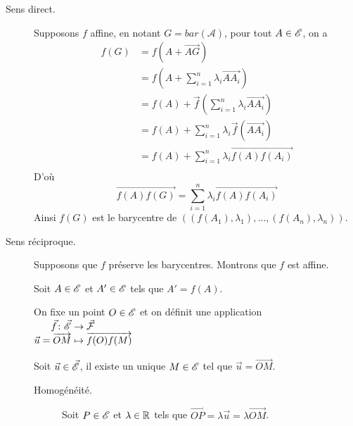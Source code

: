 \documentclass[a4paper,12pt]{article}
\begin{document}
\begin{demonstration}
    \begin{description}
        \item[Sens direct.] %
        Supposons $f$ affine, en notant $G = bar(\mathcal{A})$, pour tout $A \in \mathscr{E}$, on a
        \begin{align*}
            f(G) &= f(A + \overrightarrow{AG}) \\
        &= f(A + \sum_{i=1}^n \lambda_i \overrightarrow{A A_i}) \\
        &= f(A) + \vec{f}(\sum_{i=1}^n \lambda_i \overrightarrow{A A_i}) \\
        &= f(A) + \sum_{i=1}^n \lambda_i \vec{f}(\overrightarrow{A A_i}) \\
        &= f(A) + \sum_{i=1}^n \lambda_i \overrightarrow{f(A) f(A_i)} \\
        \end{align*}
        D'où
        $$
        \overrightarrow{f(A) f(G)} = \sum_{i=1}^n \lambda_i \overrightarrow{f(A) f(A_i)}
        $$
        Ainsi $f(G)$ est le barycentre de $((f(A_1), \lambda_1), \dots, (f(A_n), \lambda_n))$.
        
        \item[Sens réciproque.] %
        Supposons que $f$ préserve les barycentres. Montrons que $f$ est affine.

        Soit $A \in \mathscr{E}$ et $A' \in \mathscr{E}$ tels que $A' = f(A)$.

        On fixe un point $O \in \mathscr{E}$ et on définit une application $\funcdef{\vec{f}}{\vec{\E}}{\vec{\mathcal{F}}}{\vec{u} = \overrightarrow{OM}}{\overrightarrow{f(O)f(M)}}$

        Soit $\vec{u} \in \vec{\mathscr{E}}$, il existe un unique $M \in \mathscr{E}$ tel que $\vec{u} = \overrightarrow{OM}$.

        \begin{description}
            \item[Homogénéité.] %
            Soit $P \in \mathscr{E}$ et $\lambda \in \mathbb{R}$ tels que $\overrightarrow{OP} = \lambda \vec{u} = \lambda \overrightarrow{OM}$.
            

\end{description}
\end{description}
\end{demonstration}
\end{document}
